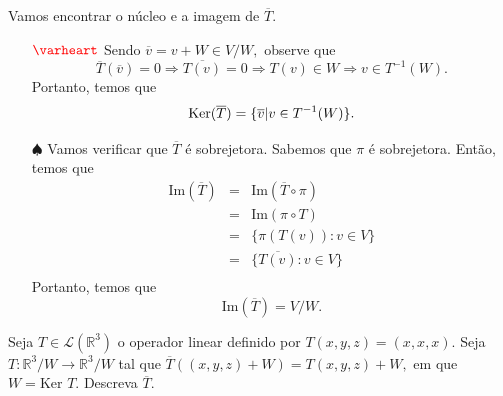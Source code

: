 \documentclass[11pt,a4paper]{article}
\begin{document}
{    Vamos encontrar o núcleo e a imagem de $\overline{T}.$
    \begin{itemize}
        \item[$\textcolor{red}{\varheart}$] Sendo $\overline{v} = v + W \in V/W,$ observe que
        \[
        \overline{T}(\overline{v}) = 0 \Rightarrow \overline{T(v)}=0 \Rightarrow T(v) \in W \Rightarrow v \in T^{-1}(W).
        \]
        Portanto, temos que
        \[
        \operatorname{Ker}(\overline{T}) = \{ \overline{v} | v \in T^{-1}(W) \}.
        \]
        
     \item[$\spadesuit$] Vamos verificar que $\overline{T}$ é sobrejetora. Sabemos que $\pi$ é sobrejetora. Então, temos que
     \[
     \begin{array}{lcr}
     \mbox{Im}(\overline{T}) &=&    \mbox{Im}(\overline{T} \circ \pi) \\
     &=&    \mbox{Im}(\pi \circ T) \\
     &=&    \{ \pi(T(v)) : v \in V \} \\
     &=&    \{ \overline{T(v)} : v \in V \} \\
     \end{array}
     \]
     Portanto, temos que
     \[
     \mbox{Im}(\overline{T}) = V/W.
     \]
    \end{itemize}

    }

 Seja $T \in \mathcal{L}(\mathbb{R}^3)$ o operador linear definido por $T(x, y, z) = (x, x, x).$ Seja $T \colon \mathbb{R}^3/W \to \mathbb{R}^3/W$
tal que $\overline{T}((x, y, z) + W) = T(x, y, z) + W,$ em que $W = \mbox{Ker } T.$ Descreva $\overline{T}.$
\end{document}

